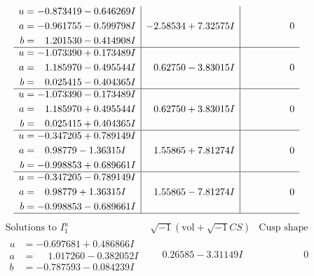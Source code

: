 \documentclass[1p]{elsarticle_modified}
\theoremstyle{definition}
\newcommand{\I}{\sqrt{-1}}
\begin{document}
$$\begin{array}{c|c|c}
\begin{aligned}
u &= -0.873419 - 0.646269 I \\
a &= -0.961755 - 0.599798 I \\
b &= \phantom{-}1.201530 - 0.414908 I\end{aligned}
 & -2.58534 + 7.32575 I & \phantom{-0.000000 } 0 \\ \hline\begin{aligned}
u &= -1.073390 + 0.173489 I \\
a &= \phantom{-}1.185970 - 0.495544 I \\
b &= \phantom{-}0.025415 - 0.404365 I\end{aligned}
 & \phantom{-}0.62750 - 3.83015 I & \phantom{-0.000000 } 0 \\ \hline\begin{aligned}
u &= -1.073390 - 0.173489 I \\
a &= \phantom{-}1.185970 + 0.495544 I \\
b &= \phantom{-}0.025415 + 0.404365 I\end{aligned}
 & \phantom{-}0.62750 + 3.83015 I & \phantom{-0.000000 } 0 \\ \hline\begin{aligned}
u &= -0.347205 + 0.789149 I \\
a &= \phantom{-}0.98779 - 1.36315 I \\
b &= -0.998853 + 0.689661 I\end{aligned}
 & \phantom{-}1.55865 + 7.81274 I & \phantom{-0.000000 } 0 \\ \hline\begin{aligned}
u &= -0.347205 - 0.789149 I \\
a &= \phantom{-}0.98779 + 1.36315 I \\
b &= -0.998853 - 0.689661 I\end{aligned}
 & \phantom{-}1.55865 - 7.81274 I & \phantom{-0.000000 } 0\\
 \hline 
 \end{array}$$\newpage$$\begin{array}{c|c|c}  
\text{Solutions to }I^u_{1}& \I (\text{vol} + \sqrt{-1}CS) & \text{Cusp shape}\\
 \hline 
\begin{aligned}
u &= -0.697681 + 0.486866 I \\
a &= \phantom{-}1.017260 - 0.382052 I \\
b &= -0.787593 - 0.084239 I\end{aligned}
 & \phantom{-}0.26585 - 3.31149 I & \phantom{-0.000000 } 0 \\ \hline\begin{aligned}

\end{aligned}
\end{array}$$
\end{document}
